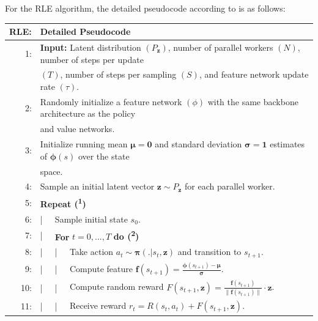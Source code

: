 \noindent For the \textsc{RLE} algorithm, the detailed pseudocode according to \cite{rle-paper} is as follows:

\begin{table}[h!]
  \centering
  \begin{tabular}{rlllll}
    \hline\hline
    \textbf{RLE:} & \multicolumn{5}{l}{Detailed Pseudocode}\\
    \hline
    1: & \multicolumn{5}{l}{\textbf{Input:} Latent distribution $\left(P_{\textbf{z}}\right)$, number of parallel workers $\left(N\right)$, number of steps per update}\\
    & \multicolumn{5}{l}{$\left(T\right)$, number of steps per sampling $\left(S\right)$, and feature network update rate $\left(\tau\right)$.}\\
    2: & \multicolumn{5}{l}{Randomly initialize a feature network $\left(\phi\right)$ with the same backbone architecture as the policy }\\
    & \multicolumn{5}{l}{and value networks.}\\
    3: & \multicolumn{5}{l}{Initialize running mean $\boldsymbol{\mu} = \textbf{0}$ and standard deviation $\boldsymbol{\sigma} = \textbf{1}$ estimates of $\boldsymbol{\phi} \left(s\right)$ over the state}\\
    & \multicolumn{5}{l}{space.}\\
    4: & \multicolumn{5}{l}{Sample an initial latent vector $\textbf{z} \sim P_{\textbf{z}}$ for each parallel worker.}\\
    5: & \multicolumn{5}{l}{\textbf{Repeat (\textsuperscript{1})}}\\
    6: & | & \multicolumn{4}{l}{Sample initial state $s_{0}$.}\\
    7: & | & \multicolumn{4}{l}{\textbf{For} $t = 0, ..., T$ \textbf{do (\textsuperscript{2})}}\\
    8: & | & | & \multicolumn{3}{l}{Take action $a_{t} \sim \boldsymbol{\pi}(. | s_{t}, \textbf{z})$ and transition to $s_{t+1}$.}\\
    9: & | & | & \multicolumn{3}{l}{Compute feature $\textbf{f}(s_{t+1}) = \frac{\boldsymbol{\phi}(s_{t+1}) - \boldsymbol{\mu}}{\boldsymbol{\sigma}}$.}\\
    10: & | & | & \multicolumn{3}{l}{Compute random reward $F(s_{t+1}, \textbf{z}) = \frac{\textbf{f}(s_{t+1})}{\| \textbf{f}(s_{t+1}) \|} \cdot \textbf{z}$.}\\
    11: & | & | & \multicolumn{3}{l}{Receive reward $r_{t} = R(s_{t}, a_{t}) + F(s_{t+1}, \textbf{z})$.}\\

\end{tabular}
\end{table}
